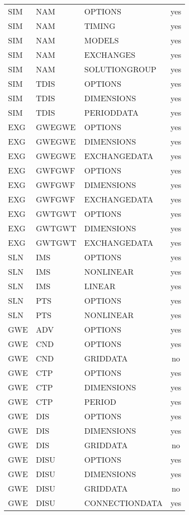 \begin{longtable}{p{1.5cm} p{1.5cm} p{3cm} c}
\hline
SIM & NAM & OPTIONS & yes \\ 
SIM & NAM & TIMING & yes \\ 
SIM & NAM & MODELS & yes \\ 
SIM & NAM & EXCHANGES & yes \\ 
SIM & NAM & SOLUTIONGROUP & yes \\ 
\hline
SIM & TDIS & OPTIONS & yes \\ 
SIM & TDIS & DIMENSIONS & yes \\ 
SIM & TDIS & PERIODDATA & yes \\ 
\hline
EXG & GWEGWE & OPTIONS & yes \\ 
EXG & GWEGWE & DIMENSIONS & yes \\ 
EXG & GWEGWE & EXCHANGEDATA & yes \\ 
\hline
EXG & GWFGWF & OPTIONS & yes \\ 
EXG & GWFGWF & DIMENSIONS & yes \\ 
EXG & GWFGWF & EXCHANGEDATA & yes \\ 
\hline
EXG & GWTGWT & OPTIONS & yes \\ 
EXG & GWTGWT & DIMENSIONS & yes \\ 
EXG & GWTGWT & EXCHANGEDATA & yes \\ 
\hline
SLN & IMS & OPTIONS & yes \\ 
SLN & IMS & NONLINEAR & yes \\ 
SLN & IMS & LINEAR & yes \\ 
\hline
SLN & PTS & OPTIONS & yes \\ 
SLN & PTS & NONLINEAR & yes \\ 
\hline
GWE & ADV & OPTIONS & yes \\ 
\hline
GWE & CND & OPTIONS & yes \\ 
GWE & CND & GRIDDATA & no \\ 
\hline
GWE & CTP & OPTIONS & yes \\ 
GWE & CTP & DIMENSIONS & yes \\ 
GWE & CTP & PERIOD & yes \\ 
\hline
GWE & DIS & OPTIONS & yes \\ 
GWE & DIS & DIMENSIONS & yes \\ 
GWE & DIS & GRIDDATA & no \\ 
\hline
GWE & DISU & OPTIONS & yes \\ 
GWE & DISU & DIMENSIONS & yes \\ 
GWE & DISU & GRIDDATA & no \\ 
GWE & DISU & CONNECTIONDATA & yes \\ 

\end{longtable}
